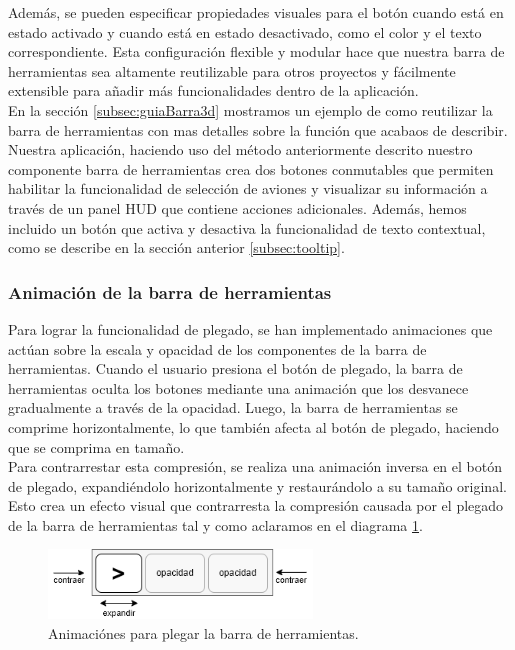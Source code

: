 \documentclass[a4paper, 11pt]{book}
\begin{document}
Además, se pueden especificar propiedades visuales para el botón cuando está en estado activado y cuando está en estado desactivado, como el color y el texto correspondiente. Esta configuración flexible y modular hace que nuestra barra de herramientas sea altamente reutilizable para otros proyectos y fácilmente extensible para añadir más funcionalidades dentro de la aplicación.\\
En la sección \ref{subsec:guiaBarra3d} mostramos un ejemplo de como reutilizar la barra de herramientas con mas detalles sobre la función que acabaos de describir.\\
Nuestra aplicación, haciendo uso del método anteriormente descrito nuestro componente barra de herramientas crea dos botones conmutables que permiten habilitar la funcionalidad de selección de aviones y visualizar su información a través de un panel \textsc{HUD} que contiene acciones adicionales. Además, hemos incluido un botón que activa y desactiva la funcionalidad de texto contextual, como se describe en la sección anterior \ref{subsec:tooltip}.
\subsubsection{Animación de la barra de herramientas}
\label{subsec:animationToolbar}
Para lograr la funcionalidad de plegado, se han implementado animaciones que actúan sobre la escala y opacidad de los componentes de la barra de herramientas. Cuando el usuario presiona el botón de plegado, la barra de herramientas oculta los botones mediante una animación que los desvanece gradualmente a través de la opacidad. Luego, la barra de herramientas se comprime horizontalmente, lo que también afecta al botón de plegado, haciendo que se comprima en tamaño.\\
Para contrarrestar esta compresión, se realiza una animación inversa en el botón de plegado, expandiéndolo horizontalmente y restaurándolo a su tamaño original. Esto crea un efecto visual que contrarresta la compresión causada por el plegado de la barra de herramientas tal y como aclaramos en el diagrama \ref{fig:animationPlegado}.
\begin{figure}[h]
  \centering
  \includegraphics[width=7cm, keepaspectratio]{img/plegadoToolbar.drawio.png}
  \caption{Animaciónes para plegar la barra de herramientas.}
  \label{fig:animationPlegado}
\end{figure}
\end{document}

